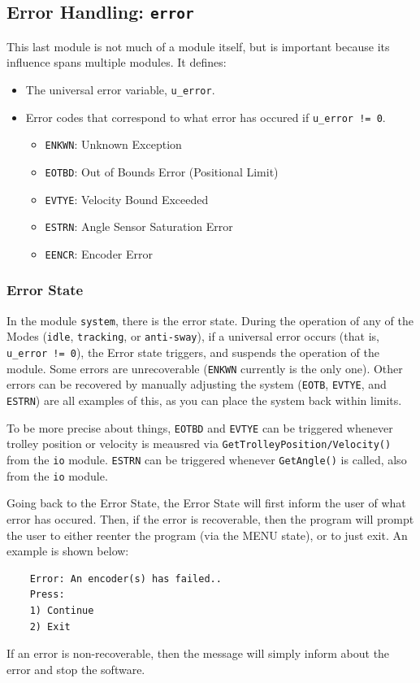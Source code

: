 \documentclass[letterpaper]{article}
\begin{document}
\subsection{Error Handling: \texttt{error}}
This last module is not much of a module itself, but is important because its influence spans multiple modules. It defines:
\begin{itemize}
    \item The universal error variable, \texttt{u\_error}.
    \item Error codes that correspond to what error has occured if \texttt{u\_error != 0}.
    \begin{itemize}
        \item \texttt{ENKWN}: Unknown Exception
        \item \texttt{EOTBD}: Out of Bounds Error (Positional Limit)
        \item \texttt{EVTYE}: Velocity Bound Exceeded
        \item \texttt{ESTRN}: Angle Sensor Saturation Error
        \item \texttt{EENCR}: Encoder Error
    \end{itemize}
\end{itemize}

\subsubsection{Error State}
In the module \texttt{system}, there is the error state. During the operation of any of the Modes (\texttt{idle}, \texttt{tracking}, or \texttt{anti-sway}), if a universal error occurs (that is, \texttt{u\_error != 0}), the Error state triggers, and suspends the operation of the module. Some errors are unrecoverable (\texttt{ENKWN} currently is the only one). Other errors can be recovered by manually adjusting the system (\texttt{EOTB}, \texttt{EVTYE}, and \texttt{ESTRN}) are all examples of this, as you can place the system back within limits.

To be more precise about things, \texttt{EOTBD} and \texttt{EVTYE} can be triggered whenever trolley position or velocity is meausred via \texttt{GetTrolleyPosition/Velocity()} from the \texttt{io} module. \texttt{ESTRN} can be triggered whenever \texttt{GetAngle()} is called, also from the \texttt{io} module.

Going back to the Error State, the Error State will first inform the user of what error has occured. Then, if the error is recoverable, then the program will prompt the user to either reenter the program (via the MENU state), or to just exit. An example is shown below:
\begin{lstlisting}
    Error: An encoder(s) has failed..
    Press:
    1) Continue
    2) Exit
\end{lstlisting}
If an error is non-recoverable, then the message will simply inform about the error and stop the software.
\end{document}
